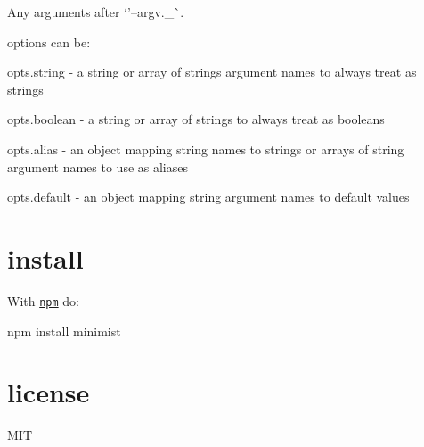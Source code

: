 Any arguments after `'--argv.\+\_\+\`{}.

options can be\+:


\begin{DoxyItemize}
\item {\ttfamily opts.\+string} -\/ a string or array of strings argument names to always treat as strings
\item {\ttfamily opts.\+boolean} -\/ a string or array of strings to always treat as booleans
\item {\ttfamily opts.\+alias} -\/ an object mapping string names to strings or arrays of string argument names to use as aliases
\item {\ttfamily opts.\+default} -\/ an object mapping string argument names to default values
\end{DoxyItemize}

\section*{install}

With \href{https://npmjs.org}{\tt npm} do\+:


\begin{DoxyCode}
npm install minimist
\end{DoxyCode}


\section*{license}

M\+IT 